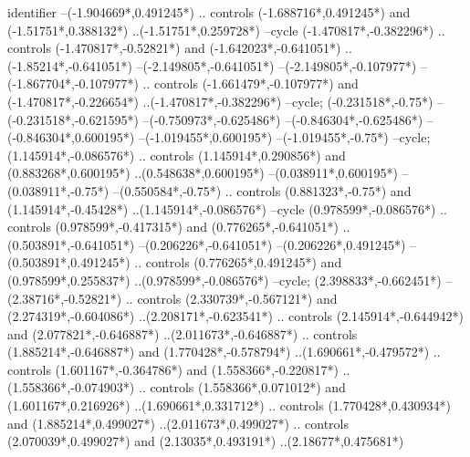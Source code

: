 {\begin{scope}[x=1mm,y=1mm,line width=\SCstroke mm,line cap=round,line join=round]
\begin{SCpart}{identifier}
--({-1.904669*\SCF},{0.491245*\SCF})
.. controls ({-1.688716*\SCF},{0.491245*\SCF}) and ({-1.51751*\SCF},{0.388132*\SCF}) ..({-1.51751*\SCF},{0.259728*\SCF})
--cycle
({-1.470817*\SCF},{-0.382296*\SCF})
.. controls ({-1.470817*\SCF},{-0.52821*\SCF}) and ({-1.642023*\SCF},{-0.641051*\SCF}) ..({-1.85214*\SCF},{-0.641051*\SCF})
--({-2.149805*\SCF},{-0.641051*\SCF})
--({-2.149805*\SCF},{-0.107977*\SCF})
--({-1.867704*\SCF},{-0.107977*\SCF})
.. controls ({-1.661479*\SCF},{-0.107977*\SCF}) and ({-1.470817*\SCF},{-0.226654*\SCF}) ..({-1.470817*\SCF},{-0.382296*\SCF})
--cycle;
 ({-0.231518*\SCF},{-0.75*\SCF})
--({-0.231518*\SCF},{-0.621595*\SCF})
--({-0.750973*\SCF},{-0.625486*\SCF})
--({-0.846304*\SCF},{-0.625486*\SCF})
--({-0.846304*\SCF},{0.600195*\SCF})
--({-1.019455*\SCF},{0.600195*\SCF})
--({-1.019455*\SCF},{-0.75*\SCF})
--cycle;
 ({1.145914*\SCF},{-0.086576*\SCF})
.. controls ({1.145914*\SCF},{0.290856*\SCF}) and ({0.883268*\SCF},{0.600195*\SCF}) ..({0.548638*\SCF},{0.600195*\SCF})
--({0.038911*\SCF},{0.600195*\SCF})
--({0.038911*\SCF},{-0.75*\SCF})
--({0.550584*\SCF},{-0.75*\SCF})
.. controls ({0.881323*\SCF},{-0.75*\SCF}) and ({1.145914*\SCF},{-0.45428*\SCF}) ..({1.145914*\SCF},{-0.086576*\SCF})
--cycle
({0.978599*\SCF},{-0.086576*\SCF})
.. controls ({0.978599*\SCF},{-0.417315*\SCF}) and ({0.776265*\SCF},{-0.641051*\SCF}) ..({0.503891*\SCF},{-0.641051*\SCF})
--({0.206226*\SCF},{-0.641051*\SCF})
--({0.206226*\SCF},{0.491245*\SCF})
--({0.503891*\SCF},{0.491245*\SCF})
.. controls ({0.776265*\SCF},{0.491245*\SCF}) and ({0.978599*\SCF},{0.255837*\SCF}) ..({0.978599*\SCF},{-0.086576*\SCF})
--cycle;
 ({2.398833*\SCF},{-0.662451*\SCF})
--({2.38716*\SCF},{-0.52821*\SCF})
.. controls ({2.330739*\SCF},{-0.567121*\SCF}) and ({2.274319*\SCF},{-0.604086*\SCF}) ..({2.208171*\SCF},{-0.623541*\SCF})
.. controls ({2.145914*\SCF},{-0.644942*\SCF}) and ({2.077821*\SCF},{-0.646887*\SCF}) ..({2.011673*\SCF},{-0.646887*\SCF})
.. controls ({1.885214*\SCF},{-0.646887*\SCF}) and ({1.770428*\SCF},{-0.578794*\SCF}) ..({1.690661*\SCF},{-0.479572*\SCF})
.. controls ({1.601167*\SCF},{-0.364786*\SCF}) and ({1.558366*\SCF},{-0.220817*\SCF}) ..({1.558366*\SCF},{-0.074903*\SCF})
.. controls ({1.558366*\SCF},{0.071012*\SCF}) and ({1.601167*\SCF},{0.216926*\SCF}) ..({1.690661*\SCF},{0.331712*\SCF})
.. controls ({1.770428*\SCF},{0.430934*\SCF}) and ({1.885214*\SCF},{0.499027*\SCF}) ..({2.011673*\SCF},{0.499027*\SCF})
.. controls ({2.070039*\SCF},{0.499027*\SCF}) and ({2.13035*\SCF},{0.493191*\SCF}) ..({2.18677*\SCF},{0.475681*\SCF})

\end{SCpart}
\end{scope}}

